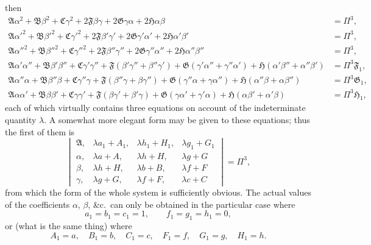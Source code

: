 \documentclass[11pt,a4paper]{book}
\begin{document}
then
\begin{align*}
\mathfrak{A}\alpha^{2} + \mathfrak{B}\beta^{2} + \mathfrak{C}\gamma^{2} + 2\mathfrak{F}\beta\gamma + 2\mathfrak{G}\gamma\alpha + 2\mathfrak{H}\alpha\beta &= \Pi^{3}, \\
\mathfrak{A}\alpha'^{2} + \mathfrak{B}\beta'^{2} + \mathfrak{C}\gamma'^{2} + 2\mathfrak{F}\beta'\gamma' + 2\mathfrak{G}\gamma'\alpha' + 2\mathfrak{H}\alpha'\beta' &= \Pi^{3}, \\
\mathfrak{A}\alpha''^{2} + \mathfrak{B}\beta''^{2} + \mathfrak{C}\gamma''^{2} + 2\mathfrak{F}\beta''\gamma'' + 2\mathfrak{G}\gamma''\alpha'' + 2\mathfrak{H}\alpha''\beta'' &= \Pi^{3}, \\
\mathfrak{A}\alpha'\alpha'' + \mathfrak{B}\beta'\beta'' + \mathfrak{C}\gamma'\gamma'' + \mathfrak{F}(\beta'\gamma'' + \beta''\gamma') + \mathfrak{G}(\gamma'\alpha'' + \gamma''\alpha') + \mathfrak{H}(\alpha'\beta'' + \alpha''\beta') &= \Pi^{3}\mathfrak{F}_{1}, \\
\mathfrak{A}\alpha''\alpha + \mathfrak{B}\beta''\beta + \mathfrak{C}\gamma''\gamma + \mathfrak{F}(\beta''\gamma + \beta\gamma'') + \mathfrak{G}(\gamma''\alpha + \gamma\alpha'') + \mathfrak{H}(\alpha''\beta + \alpha\beta'') &= \Pi^{3}\mathfrak{G}_{1}, \\
\mathfrak{A}\alpha\alpha' + \mathfrak{B}\beta\beta' + \mathfrak{C}\gamma\gamma' + \mathfrak{F}(\beta\gamma' + \beta'\gamma) + \mathfrak{G}(\gamma\alpha' + \gamma'\alpha) + \mathfrak{H}(\alpha\beta' + \alpha'\beta) &= \Pi^{3}\mathfrak{H}_{1},
\end{align*}
each of which virtually contains three equations on account of the indeterminate quantity $\lambda$. A somewhat more elegant form may be given to these equations; thus the first of them is
\[
\begin{vmatrix}
\mathfrak{A}, & \lambda a_{1} + A_{1}, & \lambda h_{1} + H_{1}, & \lambda g_{1} + G_{1} \\
\alpha, & \lambda a + A, & \lambda h + H, & \lambda g + G \\
\beta, & \lambda h + H, & \lambda b + B, & \lambda f + F \\
\gamma, & \lambda g + G, & \lambda f + F, & \lambda c + C
\end{vmatrix}
= \Pi^{3},
\]
from which the form of the whole system is sufficiently obvious. The actual values of the coefficients $\alpha$, $\beta$, \&c.\ can only be obtained in the particular case where
\[
a_{1} = b_{1} = c_{1} = 1, \qquad f_{1} = g_{1} = h_{1} = 0,
\]
or (what is the same thing) where
\[
A_{1} = a, \quad B_{1} = b, \quad C_{1} = c, \quad F_{1} = f, \quad G_{1} = g, \quad H_{1} = h.
\]
\end{document}
